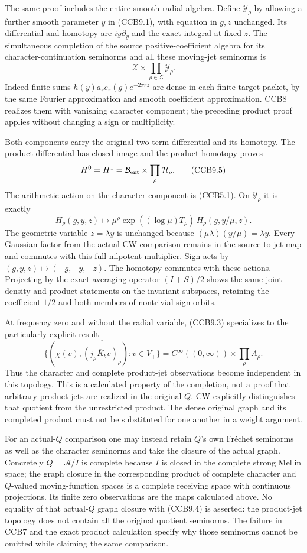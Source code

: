 The same proof includes the entire smooth-radial algebra. Define
\(\mathcal Y_\rho\) by allowing a further smooth parameter \(y\) in
(CCB9.1), with equation in \(g,z\) unchanged. Its differential and
homotopy are \(iy\partial_y\) and the exact integral at fixed \(z\). The
simultaneous completion of the source positive-coefficient algebra for
its character-continuation seminorms and all these moving-jet seminorms
is \[
\boxed{\mathcal X\times\prod_{\rho\in\mathcal Z}\mathcal Y_\rho.}
\tag{CCB9.4}
\] Indeed finite sums \(h(y)a_re_r(g)e^{-2\pi rz}\) are dense in each
finite target packet, by the same Fourier approximation and smooth
coefficient approximation. CCB8 realizes them with vanishing character
component; the preceding product proof applies without changing a sign
or multiplicity.

Both components carry the original two-term differential and its
homotopy. The product differential has closed image and the product
homotopy proves \[
H^0=H^1=
\mathcal B_{\rm ent}\times\prod_\rho\mathcal H_\rho.
\tag{CCB9.5}
\] The arithmetic action on the character component is (CCB5.1). On
\(\mathcal Y_\rho\) it is exactly \[
H_\rho(g,y,z)\longmapsto
\mu^\rho\exp((\log\mu)T_\rho)\,
H_\rho(g,y/\mu,z).
\tag{CCB9.6}
\] The geometric variable \(z=\lambda y\) is unchanged because
\((\mu\lambda)(y/\mu)=\lambda y\). Every Gaussian factor from the actual
CW comparison remains in the source-to-jet map and commutes with this
full nilpotent multiplier. Sign acts by \((g,y,z)\mapsto(-g,-y,-z)\).
The homotopy commutes with these actions. Projecting by the exact
averaging operator \((I+S)/2\) shows the same joint-density and product
statements on the invariant subspaces, retaining the coefficient \(1/2\)
and both members of nontrivial sign orbits.

At frequency zero and without the radial variable, (CCB9.3) specializes
to the particularly explicit result \[
\overline{\{(\chi(v),(j_\rho\overline K_bv)_\rho):v\in V_+\}}
=
C^\infty((0,\infty))\times\prod_\rho A_\rho.
\tag{CCB9.7}
\] Thus the character and complete product-jet observations become
independent in this topology. This is a calculated property of the
completion, not a proof that arbitrary product jets are realized in the
original \(Q\). CW explicitly distinguishes that quotient from the
unrestricted product. The dense original graph and its completed product
must not be substituted for one another in a weight argument.

For an actual-\(Q\) comparison one may instead retain \(Q\)'s own
Fréchet seminorms as well as the character seminorms and take the
closure of the actual graph. Concretely \(Q=\mathcal A/I\) is complete
because \(I\) is closed in the complete strong Mellin space; the graph
closure in the corresponding product of complete character and
\(Q\)-valued moving-function spaces is a complete receiving space with
continuous projections. Its finite zero observations are the maps
calculated above. No equality of that actual-\(Q\) graph closure with
(CCB9.4) is asserted: the product-jet topology does not contain all the
original quotient seminorms. The failure in CCB7 and the exact product
calculation specify why those seminorms cannot be omitted while claiming
the same comparison.

